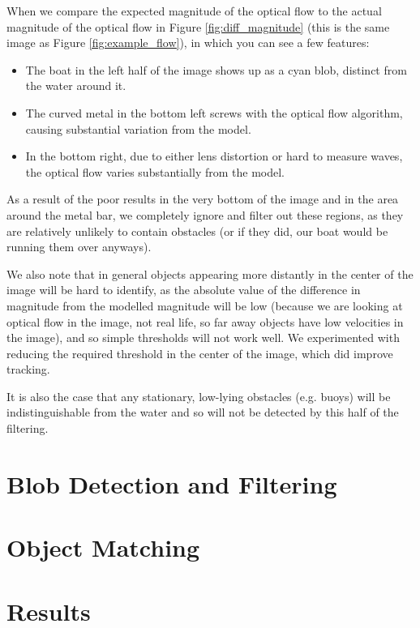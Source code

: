 \documentclass{article}
\begin{document}
When we compare the expected magnitude of the optical flow to the
actual magnitude of the optical flow in Figure \ref{fig:diff_magnitude}
(this is the same image as Figure \ref{fig:example_flow}),
in which you can see a few features:
\begin{itemize}
\item The boat in the left half of the image shows up as a cyan blob, distinct
      from the water around it.
\item The curved metal in the bottom left screws with the optical flow
      algorithm, causing substantial variation from the model.
\item In the bottom right, due to either lens distortion or hard to measure
      waves, the optical flow varies substantially from the model.
\end{itemize}

As a result of the poor results in the very bottom of the image and in the
area around the metal bar, we completely ignore and filter out these regions,
as they are relatively unlikely to contain obstacles (or if they did, our
boat would be running them over anyways).

We also note that in general objects appearing more distantly in the center of
the image will be hard to identify, as the absolute value of the difference
in magnitude from the modelled magnitude will be low (because we are looking
at optical flow in the image, not real life, so far away objects have
low velocities in the image), and so simple thresholds will not work well.
We experimented with reducing the required threshold in the center of the image,
which did improve tracking.

It is also the case that any stationary, low-lying obstacles (e.g. buoys)
will be indistinguishable from the water and so will not be detected
by this half of the filtering.

\section{Blob Detection and Filtering}

\section{Object Matching}

\section{Results}
\end{document}
